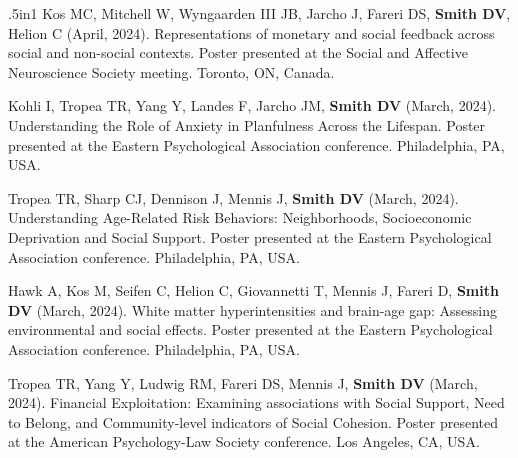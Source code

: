 \documentclass[11pt, letterpaper]{article}
\begin{document}
\begin{hangparas}{.5in}{1}
Kos MC, Mitchell W, Wyngaarden III JB, Jarcho J, Fareri DS, \textbf{Smith DV}, Helion C (April, 2024). Representations of monetary and social feedback across social and non-social contexts. Poster presented at the Social and Affective Neuroscience Society meeting. Toronto, ON, Canada.

Kohli I, Tropea TR, Yang Y, Landes F, Jarcho JM, \textbf{Smith DV} (March, 2024). Understanding the Role of Anxiety in Planfulness Across the Lifespan. Poster presented at the Eastern Psychological Association conference. Philadelphia, PA, USA.

Tropea TR, Sharp CJ, Dennison J, Mennis J, \textbf{Smith DV} (March, 2024). Understanding Age-Related Risk Behaviors: Neighborhoods, Socioeconomic Deprivation and Social Support. Poster presented at the Eastern Psychological Association conference. Philadelphia, PA, USA. 

Hawk A, Kos M, Seifen C, Helion C, Giovannetti T, Mennis J, Fareri D, \textbf{Smith DV} (March, 2024). White matter hyperintensities and brain-age gap: Assessing environmental and social effects. Poster presented at the Eastern Psychological Association conference. Philadelphia, PA, USA.

Tropea TR, Yang Y, Ludwig RM, Fareri DS, Mennis J, \textbf{Smith DV} (March, 2024). Financial Exploitation: Examining associations with Social Support, Need to Belong, and Community-level indicators of Social Cohesion. Poster presented at the American Psychology-Law Society conference. Los Angeles, CA, USA. \\

\end{hangparas}
\end{document}

